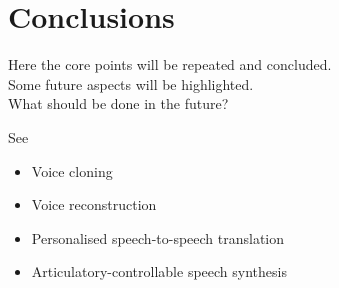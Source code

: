 

\section{Conclusions}
\label{sec:conclusion}

Here the core points will be repeated and concluded.\\
Some future aspects will be highlighted.\\
What should be done in the future?

\vspace{2em}
See \cite{edinburgh:speech}
\begin{itemize}[leftmargin=10pt]
	\item Voice cloning
	\item Voice reconstruction
	\item Personalised speech-to-speech translation
	\item Articulatory-controllable speech synthesis
\end{itemize}
